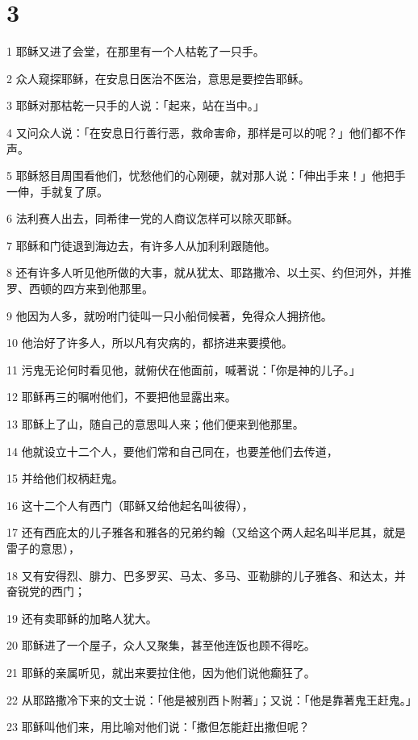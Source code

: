 \chapter{3}

\par 1 耶稣又进了会堂，在那里有一个人枯乾了一只手。
\par 2 众人窥探耶稣，在安息日医治不医治，意思是要控告耶稣。
\par 3 耶稣对那枯乾一只手的人说：「起来，站在当中。」
\par 4 又问众人说：「在安息日行善行恶，救命害命，那样是可以的呢？」他们都不作声。
\par 5 耶稣怒目周围看他们，忧愁他们的心刚硬，就对那人说：「伸出手来！」他把手一伸，手就复了原。
\par 6 法利赛人出去，同希律一党的人商议怎样可以除灭耶稣。
\par 7 耶稣和门徒退到海边去，有许多人从加利利跟随他。
\par 8 还有许多人听见他所做的大事，就从犹太、耶路撒冷、以土买、约但河外，并推罗、西顿的四方来到他那里。
\par 9 他因为人多，就吩咐门徒叫一只小船伺候著，免得众人拥挤他。
\par 10 他治好了许多人，所以凡有灾病的，都挤进来要摸他。
\par 11 污鬼无论何时看见他，就俯伏在他面前，喊著说：「你是神的儿子。」
\par 12 耶稣再三的嘱咐他们，不要把他显露出来。
\par 13 耶稣上了山，随自己的意思叫人来；他们便来到他那里。
\par 14 他就设立十二个人，要他们常和自己同在，也要差他们去传道，
\par 15 并给他们权柄赶鬼。
\par 16 这十二个人有西门（耶稣又给他起名叫彼得），
\par 17 还有西庇太的儿子雅各和雅各的兄弟约翰（又给这个两人起名叫半尼其，就是雷子的意思），
\par 18 又有安得烈、腓力、巴多罗买、马太、多马、亚勒腓的儿子雅各、和达太，并奋锐党的西门；
\par 19 还有卖耶稣的加略人犹大。
\par 20 耶稣进了一个屋子，众人又聚集，甚至他连饭也顾不得吃。
\par 21 耶稣的亲属听见，就出来要拉住他，因为他们说他癫狂了。
\par 22 从耶路撒冷下来的文士说：「他是被别西卜附著」；又说：「他是靠著鬼王赶鬼。」
\par 23 耶稣叫他们来，用比喻对他们说：「撒但怎能赶出撒但呢？
